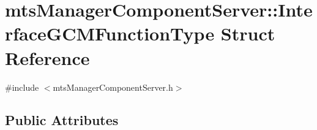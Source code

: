 \hypertarget{structmts_manager_component_server_1_1_interface_g_c_m_function_type}{}\section{mts\+Manager\+Component\+Server\+:\+:Interface\+G\+C\+M\+Function\+Type Struct Reference}
\label{structmts_manager_component_server_1_1_interface_g_c_m_function_type}


{\ttfamily \#include $<$mts\+Manager\+Component\+Server.\+h$>$}

\subsection*{Public Attributes}
